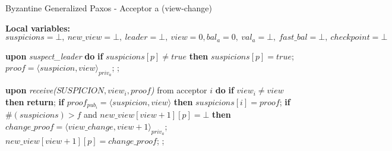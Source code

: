 \begin{algorithm} 
	\caption{Byzantine Generalized Paxos - Acceptor a (view-change)}
	\label{BFT-Proc}
	\textbf{Local variables:} $suspicions = \bot,\ new\_view = \bot,\ leader = \bot,\ view = 0, bal_a = 0,\ val_a = \bot,\ fast\_bal = \bot,\ checkpoint=\bot$
	\vspace*{-.5cm}
	\begin{multicols}{2}
		\begin{algorithmic}[1]
			
			\State \textbf{upon} \textit{suspect\_leader} \textbf{do} 
			\State \hspace{\algorithmicindent} \textbf{if} $suspicions[p] \neq true$ \textbf{then}
			\State \hspace{\algorithmicindent}\hspace{\algorithmicindent} $suspicions[p] = true$;
			\State \hspace{\algorithmicindent}\hspace{\algorithmicindent} $proof = \langle suspicion, view \rangle_{priv_a}$;
			\State \hspace{\algorithmicindent}\hspace{\algorithmicindent} ;	
			\State
			
			\State \textbf{upon} \textit{receive($SUSPICION, view_i, proof$)} from acceptor $i$ \textbf{do} 
			\State \hspace{\algorithmicindent} \textbf{if} $view_i \neq view$ \textbf{then}
			\State \hspace{\algorithmicindent}\hspace{\algorithmicindent} \textbf{return};
			\State
			\State \hspace{\algorithmicindent} \textbf{if} $proof_{pub_i} = \langle suspicion, view \rangle$ \textbf{then}
			\State \hspace{\algorithmicindent}\hspace{\algorithmicindent} $suspicions[i] = proof$;
			\State
			\State \hspace{\algorithmicindent} \textbf{if} $\#(suspicions) > f$ and $new\_view[view+1][p] = \bot$ \textbf{then}
			\State \hspace{\algorithmicindent}\hspace{\algorithmicindent} $change\_proof = \langle view\_change, view +1 \rangle_{priv_a}$;
			\State \hspace{\algorithmicindent}\hspace{\algorithmicindent} $new\_view[view+1][p] = change\_proof$;
			\State \hspace{\algorithmicindent}\hspace{\algorithmicindent} ;
			\State
			

\end{algorithmic}
\end{multicols}
\end{algorithm}

